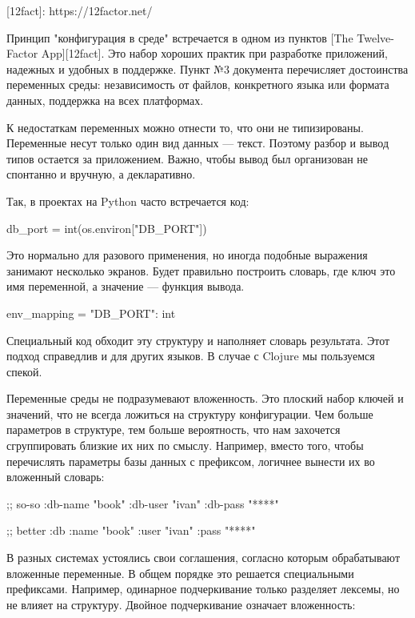 [12fact]: https://12factor.net/

Принцип "конфигурация в среде" встречается в одном из пунктов [The Twelve-Factor
App][12fact]. Это набор хороших практик при разработке приложений, надежных и
удобных в поддержке. Пункт №3 документа перечисляет достоинства переменных
среды: независимость от файлов, конкретного языка или формата данных, поддержка
на всех платформах.

К недостаткам переменных можно отнести то, что они не типизированы. Переменные
несут только один вид данных — текст. Поэтому разбор и вывод типов остается за
приложением. Важно, чтобы вывод был организован не спонтанно и вручную, а
декларативно.

Так, в проектах на Python часто встречается код:

\begin{code}
db_port = int(os.environ["DB_PORT"])
\end{code}

Это нормально для разового применения, но иногда подобные выражения занимают
несколько экранов. Будет правильно построить словарь, где ключ это имя
переменной, а значение — функция вывода.

\begin{code}
env_mapping = {"DB_PORT": int}
\end{code}

Специальный код обходит эту структуру и наполняет словарь результата. Этот
подход справедлив и для других языков. В случае с Clojure мы пользуемся спекой.

Переменные среды не подразумевают вложенность. Это плоский набор ключей и
значений, что не всегда ложиться на структуру конфигурации. Чем больше
параметров в структуре, тем больше вероятность, что нам захочется сгруппировать
близкие их них по смыслу. Например, вместо того, чтобы перечислять параметры
базы данных с префиксом, логичнее вынести их во вложенный словарь:

\begin{code}
;; so-so
{:db-name "book"
 :db-user "ivan"
 :db-pass "****"}

;; better
{:db {:name "book"
      :user "ivan"
      :pass "****"}}
\end{code}

В разных системах устоялись свои соглашения, согласно которым обрабатывают
вложенные переменные. В общем порядке это решается специальными
префиксами. Например, одинарное подчеркивание только разделяет лексемы, но не
влияет на структуру. Двойное подчеркивание означает вложенность:

